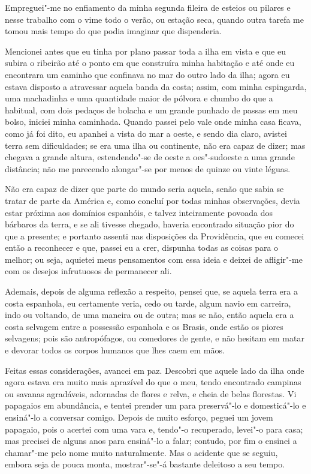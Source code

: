 Empreguei"-me no enfiamento da minha segunda fileira de esteios ou
pilares e nesse trabalho com o vime todo o verão, ou estação seca,
quando outra tarefa me tomou mais tempo do que podia imaginar que
dispenderia.

Mencionei antes que eu tinha por plano passar toda a ilha em vista e que
eu subira o ribeirão até o ponto em que construíra minha habitação e até
onde eu encontrara um caminho que confinava no mar do outro lado da
ilha; agora eu estava disposto a atravessar aquela banda da costa;
assim, com minha espingarda, uma machadinha e uma quantidade maior de
pólvora e chumbo do que a habitual, com dois pedaços de bolacha e um
grande punhado de passas em meu bolso, iniciei minha caminhada. Quando
passei pelo vale onde minha casa ficava, como já foi dito, eu apanhei a
vista do mar a oeste, e sendo dia claro, avistei terra sem dificuldades;
se era uma ilha ou continente, não era capaz de dizer; mas chegava a
grande altura, estendendo"-se de oeste a oes"-sudoeste a uma grande
distância; não me parecendo alongar"-se por menos de quinze ou vinte
léguas.

Não era capaz de dizer que parte do mundo seria aquela, senão que sabia
se tratar de parte da América e, como concluí por todas minhas
observações, devia estar próxima aos domínios espanhóis, e talvez
inteiramente povoada dos bárbaros da terra, e se ali tivesse chegado,
haveria encontrado situação pior do que a presente; e portanto assenti
nas disposições da Providência, que eu comecei então a reconhecer e que,
passei eu a crer, dispunha todas as coisas para o melhor; ou seja,
aquietei meus pensamentos com essa ideia e deixei de afligir"-me com os
desejos infrutuosos de permanecer ali.

Ademais, depois de alguma reflexão a respeito, pensei que, se aquela
terra era a costa espanhola, eu certamente veria, cedo ou tarde, algum
navio em carreira, indo ou voltando, de uma maneira ou de outra; mas se
não, então aquela era a costa selvagem entre a possessão espanhola e os
Brasis, onde estão os piores selvagens; pois são antropófagos, ou
comedores de gente, e não hesitam em matar e devorar todos os corpos
humanos que lhes caem em mãos.

Feitas essas considerações, avancei em paz. Descobri que aquele lado da
ilha onde agora estava era muito mais aprazível do que o meu, tendo
encontrado campinas ou savanas agradáveis, adornadas de flores e relva,
e cheia de belas florestas. Vi papagaios em abundância, e tentei prender
um para preservá"-lo e domesticá"-lo e ensiná"-lo a conversar comigo.
Depois de muito esforço, peguei um jovem papagaio, pois o acertei com
uma vara e, tendo"-o recuperado, levei"-o para casa; mas precisei de
alguns anos para ensiná"-lo a falar; contudo, por fim o ensinei a
chamar"-me pelo nome muito naturalmente. Mas o acidente que se seguiu,
embora seja de pouca monta, mostrar"-se"-á bastante deleitoso a seu tempo.

